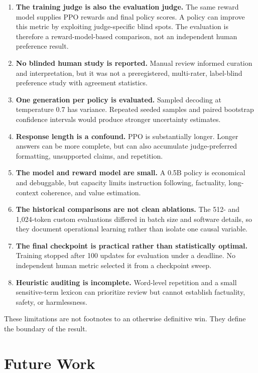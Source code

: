 \documentclass[11pt]{article}
\begin{document}
\begin{enumerate}
  \item \textbf{The training judge is also the evaluation judge.} The same
  reward model supplies PPO rewards and final policy scores. A policy can
  improve this metric by exploiting judge-specific blind spots. The evaluation
  is therefore a reward-model-based comparison, not an independent human
  preference result.
  \item \textbf{No blinded human study is reported.} Manual review informed
  curation and interpretation, but it was not a preregistered, multi-rater,
  label-blind preference study with agreement statistics.
  \item \textbf{One generation per policy is evaluated.} Sampled decoding at
  temperature 0.7 has variance. Repeated seeded samples and paired bootstrap
  confidence intervals would produce stronger uncertainty estimates.
  \item \textbf{Response length is a confound.} PPO is substantially longer.
  Longer answers can be more complete, but can also accumulate judge-preferred
  formatting, unsupported claims, and repetition.
  \item \textbf{The model and reward model are small.} A 0.5B policy is
  economical and debuggable, but capacity limits instruction following,
  factuality, long-context coherence, and value estimation.
  \item \textbf{The historical comparisons are not clean ablations.} The
  512- and 1,024-token custom evaluations differed in batch size and software
  details, so they document operational learning rather than isolate one
  causal variable.
  \item \textbf{The final checkpoint is practical rather than statistically
  optimal.} Training stopped after 100 updates for evaluation under a deadline.
  No independent human metric selected it from a checkpoint sweep.
  \item \textbf{Heuristic auditing is incomplete.} Word-level repetition and a
  small sensitive-term lexicon can prioritize review but cannot establish
  factuality, safety, or harmlessness.
\end{enumerate}

These limitations are not footnotes to an otherwise definitive win. They
define the boundary of the result.

\section{Future Work}
\end{document}
